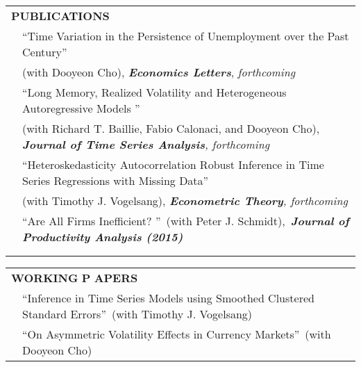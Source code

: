 \documentclass[10pt]{article}
\begin{document}
\begin{center}
\begin{tabular}{llllr}
\multicolumn{5}{l}{{\Large \textbf{P}}\textbf{UBLICATIONS}} \vspace{0.1cm}\\
& \multicolumn{4}{l}{\textquotedblleft Time Variation in the Persistence of Unemployment over the Past Century\textquotedblright}\\
 & \multicolumn{4}{l}{\hspace{0.2cm}(with Dooyeon Cho), {\bf\emph{Economics Letters}}, \emph{forthcoming}}  \vspace{0.1cm}\\
& \multicolumn{4}{l}{\textquotedblleft  Long Memory, Realized Volatility and Heterogeneous Autoregressive Models \textquotedblright \ }\\
& \multicolumn{4}{l}{\hspace{0.2cm}(with Richard T. Baillie, Fabio Calonaci, and Dooyeon Cho),\, \emph{{\bf\emph {Journal of Time Series Analysis}}, forthcoming  }} \vspace{0.1cm}\\
& \multicolumn{4}{l}{\textquotedblleft Heteroskedasticity Autocorrelation Robust Inference in Time Series Regressions with Missing Data\textquotedblright \ } \\
& \multicolumn{4}{l}{\hspace{0.2cm}(with Timothy J. Vogelsang), \emph{{\bf{\emph Econometric Theory}}, forthcoming}}  \vspace{0.1cm}\\
& \multicolumn{4}{l}{\textquotedblleft Are All Firms Inefficient?
\textquotedblright \ (with Peter J. Schmidt),\, {\bf\emph{Journal of Productivity Analysis (2015)}} } \\
\multicolumn{5}{p{500pt}}{}\\\\
\end{tabular}
\begin{tabular}{llllr}
\multicolumn{5}{l}{{\Large \textbf{W}}\textbf{ORKING} {\Large \textbf{P}}%
\textbf{APERS}} \vspace{0.1cm}\\
& \multicolumn{4}{l}{\textquotedblleft Inference in Time Series Models using Smoothed Clustered Standard Errors\textquotedblright \ (with Timothy J. Vogelsang)} \vspace{0.1cm}\\
& \multicolumn{4}{l}{\textquotedblleft On Asymmetric Volatility Effects in Currency Markets\textquotedblright \ (with Dooyeon Cho)} \vspace{0.1cm}\\

\end{tabular}
\end{center}
\end{document}
